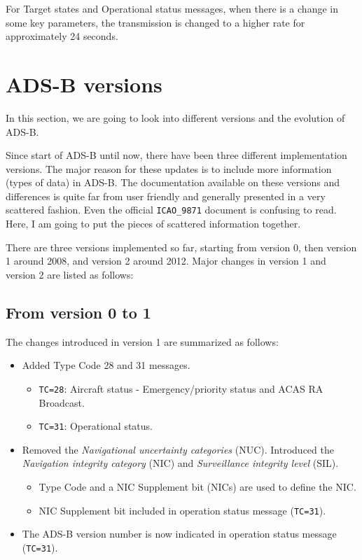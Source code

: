 For Target states and Operational status messages, when there is a change in some key parameters, the transmission is changed to a higher rate for approximately 24 seconds.



\section{ADS-B versions}

In this section, we are going to look into different versions and the evolution of ADS-B.

Since start of ADS-B until now, there have been three different implementation versions. The major reason for these updates is to include more information (types of data) in ADS-B. The documentation available on these versions and differences is quite far from user friendly and generally presented in a very scattered fashion. Even the official \texttt{ICAO\_9871} document is confusing to read. Here, I am going to put the pieces of scattered information together.

There are three versions implemented so far, starting from version 0, then version 1 around 2008, and version 2 around 2012. Major changes in version 1 and version 2 are listed as follows:

\subsection{From version 0 to 1}

The changes introduced in version 1 are summarized as follows:

\begin{itemize}
  \item Added Type Code 28 and 31 messages.

  \begin{itemize}
    \item \texttt{TC=28}: Aircraft status - Emergency/priority status and ACAS RA Broadcast.
    \item \texttt{TC=31}: Operational status.
  \end{itemize}

  \item Removed the \emph{Navigational uncertainty categories} (NUC). Introduced the \emph{Navigation integrity category} (NIC) and \emph{Surveillance integrity level} (SIL).

  \begin{itemize}
    \item Type Code and a NIC Supplement bit (NICs) are used to define the NIC.
    \item NIC Supplement bit included in operation status message (\texttt{TC=31}).
  \end{itemize}

  \item The ADS-B version number is now indicated in operation status message (\texttt{TC=31}).
\end{itemize}

